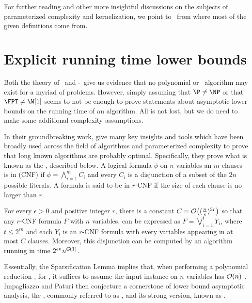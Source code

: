 For further reading and other more insightful discussions on the subjects of parameterized complexity and kernelization, we point to~\citep{downey_fellows, cygan_parameterized, book-kernels} from where most of the given definitions come from. 

\section{Explicit running time lower bounds}

Both the theory of \NPcness\ and \W[1]-\Hness\ give us evidence that no polynomial or \FPT\ algorithm may exist for a myriad of problems.
However, simply assuming that $\P \neq \NP$ or that $\FPT \neq \W[1]$ seems to not be enough to prove statements about asymptotic lower bounds on the running time of an algorithm.
All is not lost, but we do need to make some additional complexity assumptions.

In their groundbreaking work, \cite{eth} give many key insights and tools which have been broadly used across the field of algorithms and parameterized complexity to prove that long known algorithms are probably optimal.
Specifically, they prove what is known as the , described below.
A logical formula $\phi$ on $n$ variables an $m$ clauses is in  (CNF) if $\phi = \bigwedge_{i=1}^m C_i$ and every $C_i$ is a disjunction of a subset of the $2n$ possible literals.
A formula is said to be in $r$-CNF if the size of each clause is no larger than $r$.

\begin{class_definition*}
    For every $\epsilon > 0$ and positive
    integer $r$, there is a constant $C = \mathcal{O}\!\left((\frac{n}{\epsilon})^{3r}\right)$ so that any $r$-CNF formula $F$ with $n$ variables, can be expressed as $F = \bigvee_{i=1}^t Y_i$, where $t \leq 2^{\epsilon n}$ and each $Y_i$ is an $r$-CNF formula with every variables appearing in at most $C$ clauses.
    Moreover, this disjunction can be computed by an algorithm running in time $2^{\epsilon n}n^{\mathcal{O}\!\left(1\right)}$.
\end{class_definition*}

Essentially, the Sparsification Lemma implies that, when performing a polynomial reduction , for , it suffices to assume the input instance on $n$ variables has $\mathcal{O}\!\left(n\right)$ .
Impagliazzo and Paturi then conjecture a cornerstone of lower bound asymptotic analysis, the , commonly referred to as \ETH, and its strong version, known as \SETH.

